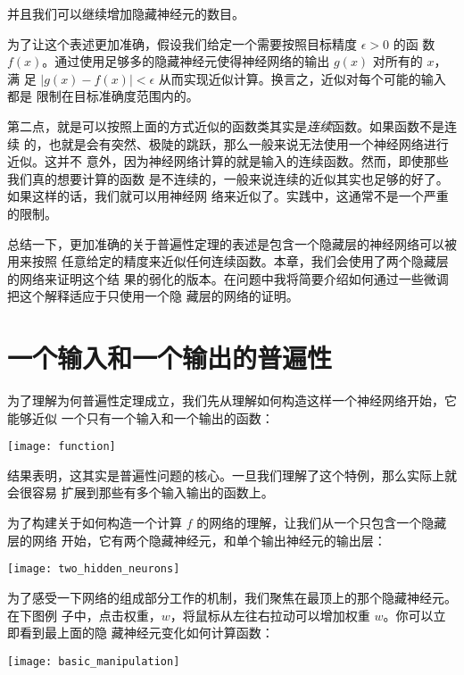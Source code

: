 并且我们可以继续增加隐藏神经元的数目。

为了让这个表述更加准确，假设我们给定一个需要按照目标精度 $\epsilon > 0$ 的函
数 $f(x)$。通过使用足够多的隐藏神经元使得神经网络的输出 $g(x)$ 对所有的 $x$，满
足 $|g(x) - f(x)| < \epsilon$ 从而实现近似计算。换言之，近似对每个可能的输入都是
限制在目标准确度范围内的。

第二点，就是可以按照上面的方式近似的函数类其实是\emph{连续}函数。如果函数不是连续
的，也就是会有突然、极陡的跳跃，那么一般来说无法使用一个神经网络进行近似。这并不
意外，因为神经网络计算的就是输入的连续函数。然而，即使那些我们真的想要计算的函数
是不连续的，一般来说连续的近似其实也足够的好了。如果这样的话，我们就可以用神经网
络来近似了。实践中，这通常不是一个严重的限制。

总结一下，更加准确的关于普遍性定理的表述是包含一个隐藏层的神经网络可以被用来按照
任意给定的精度来近似任何连续函数。本章，我们会使用了两个隐藏层的网络来证明这个结
果的弱化的版本。在问题中我将简要介绍如何通过一些微调把这个解释适应于只使用一个隐
藏层的网络的证明。

\section{一个输入和一个输出的普遍性}
\label{sec:universality_with_one_input_and_one_output}

为了理解为何普遍性定理成立，我们先从理解如何构造这样一个神经网络开始，它能够近似
一个只有一个输入和一个输出的函数：
\begin{center}
  \texttt{[image: function]}
\end{center}

结果表明，这其实是普遍性问题的核心。一旦我们理解了这个特例，那么实际上就会很容易
扩展到那些有多个输入输出的函数上。

为了构建关于如何构造一个计算 $f$ 的网络的理解，让我们从一个只包含一个隐藏层的网络
开始，它有两个隐藏神经元，和单个输出神经元的输出层：
\begin{center}
  \texttt{[image: two\_hidden\_neurons]}
\end{center}

为了感受一下网络的组成部分工作的机制，我们聚焦在最顶上的那个隐藏神经元。在下图例
子中，点击权重，$w$，将鼠标从左往右拉动可以增加权重 $w$。你可以立即看到最上面的隐
藏神经元变化如何计算函数：
\begin{center}
  \texttt{[image: basic\_manipulation]}
\end{center}

